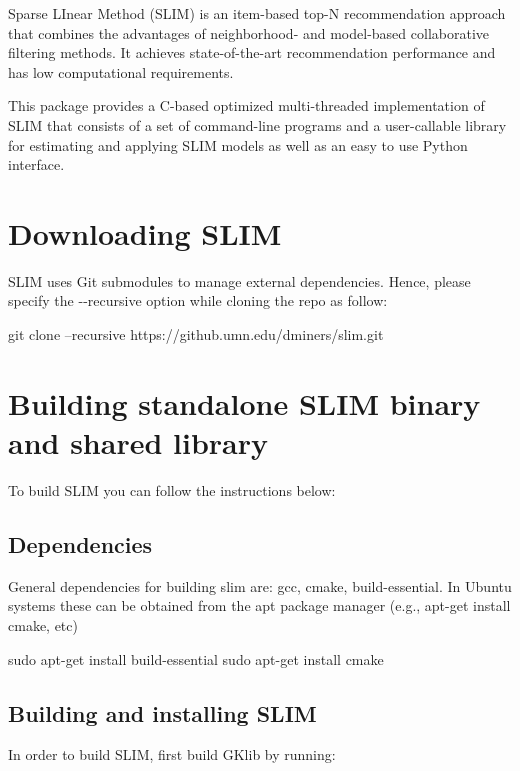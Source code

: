 Sparse L\+Inear Method (S\+L\+IM) \cite{ning2011slim} is an item-\/based top-\/N recommendation approach that combines the advantages of neighborhood-\/ and model-\/based collaborative filtering methods. It achieves state-\/of-\/the-\/art recommendation performance and has low computational requirements.

This package provides a C-\/based optimized multi-\/threaded implementation of S\+L\+IM that consists of a set of command-\/line programs and a user-\/callable library for estimating and applying S\+L\+IM models as well as an easy to use Python interface.



 \hypertarget{index_download}{}\section{Downloading S\+L\+IM}\label{index_download}
S\+L\+IM uses Git submodules to manage external dependencies. Hence, please specify the {\ttfamily -\/-\/recursive} option while cloning the repo as follow\+: 
\begin{DoxyCode}
git clone --recursive https://github.umn.edu/dminers/slim.git
\end{DoxyCode}
\hypertarget{index_installation}{}\section{Building standalone S\+L\+I\+M binary and shared library}\label{index_installation}
To build S\+L\+IM you can follow the instructions below\+:\hypertarget{index_deps}{}\subsection{Dependencies}\label{index_deps}
General dependencies for building slim are\+: gcc, cmake, build-\/essential. In Ubuntu systems these can be obtained from the apt package manager (e.\+g., apt-\/get install cmake, etc)

\begin{DoxyVerb}sudo apt-get install build-essential
sudo apt-get install cmake
\end{DoxyVerb}
\hypertarget{index_without_mkl}{}\subsection{Building and installing S\+L\+IM}\label{index_without_mkl}
In order to build S\+L\+IM, first build G\+Klib by running\+:

